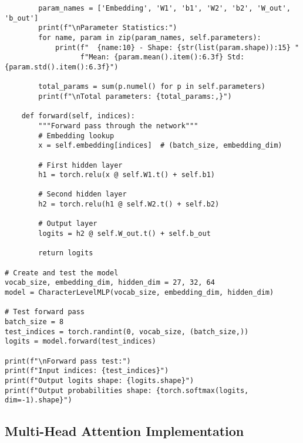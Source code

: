 \documentclass[11pt,a4paper]{book}
\begin{document}
\begin{verbatim}
        param_names = ['Embedding', 'W1', 'b1', 'W2', 'b2', 'W_out', 'b_out']
        print(f"\nParameter Statistics:")
        for name, param in zip(param_names, self.parameters):
            print(f"  {name:10} - Shape: {str(list(param.shape)):15} "
                  f"Mean: {param.mean().item():6.3f} Std: {param.std().item():6.3f}")
        
        total_params = sum(p.numel() for p in self.parameters)
        print(f"\nTotal parameters: {total_params:,}")
    
    def forward(self, indices):
        """Forward pass through the network"""
        # Embedding lookup
        x = self.embedding[indices]  # (batch_size, embedding_dim)
        
        # First hidden layer
        h1 = torch.relu(x @ self.W1.t() + self.b1)
        
        # Second hidden layer
        h2 = torch.relu(h1 @ self.W2.t() + self.b2)
        
        # Output layer
        logits = h2 @ self.W_out.t() + self.b_out
        
        return logits

# Create and test the model
vocab_size, embedding_dim, hidden_dim = 27, 32, 64
model = CharacterLevelMLP(vocab_size, embedding_dim, hidden_dim)

# Test forward pass
batch_size = 8
test_indices = torch.randint(0, vocab_size, (batch_size,))
logits = model.forward(test_indices)

print(f"\nForward pass test:")
print(f"Input indices: {test_indices}")
print(f"Output logits shape: {logits.shape}")
print(f"Output probabilities shape: {torch.softmax(logits, dim=-1).shape}")
\end{verbatim}

\subsection{Multi-Head Attention Implementation}
\end{document}
